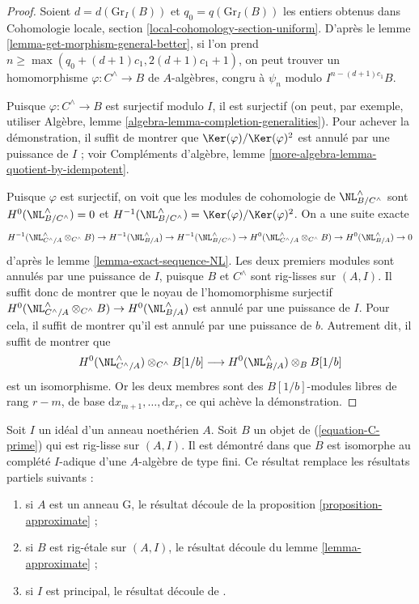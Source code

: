 \begin{proof}
\medskip\noindent
Soient $d = d(\text{Gr}_I(B))$ et $q_0 = q(\text{Gr}_I(B))$ les entiers
obtenus dans Cohomologie locale, section
\ref{local-cohomology-section-uniform}. D'après le lemme
\ref{lemma-get-morphism-general-better}, si l'on prend
$n \geq \max(q_0 + (d + 1)c_1, 2(d + 1)c_1 + 1)$, on peut trouver un
homomorphisme $\varphi : C^\wedge \to B$ de $A$-algèbres, congru à $\psi_n$
modulo $I^{n - (d + 1)c_1}B$.

\medskip\noindent
Puisque $\varphi : C^\wedge \to B$ est surjectif modulo $I$, il est surjectif
(on peut, par exemple, utiliser Algèbre, lemme
\ref{algebra-lemma-completion-generalities}). Pour achever la démonstration, il
suffit de montrer que $\Ker(\varphi)/\Ker(\varphi)^2$ est annulé par une
puissance de $I$ ; voir Compléments d'algèbre, lemme
\ref{more-algebra-lemma-quotient-by-idempotent}.

\medskip\noindent
Puisque $\varphi$ est surjectif, on voit que les modules de cohomologie de
$\NL_{B/C^{\wedge}}^\wedge$ sont
$H^0(\NL_{B/C^{\wedge}}^\wedge) = 0$ et
$H^{-1}(\NL_{B/C^{\wedge}}^\wedge) = \Ker(\varphi)/\Ker(\varphi)^2$.
On a une suite exacte
$$
H^{-1}(\NL_{C^\wedge/A}^\wedge \otimes_{C^\wedge} B) \to
H^{-1}(\NL_{B/A}^\wedge) \to
H^{-1}(\NL_{B/C^{\wedge}}^\wedge) \to
H^0(\NL_{C^\wedge/A}^\wedge \otimes_{C^\wedge} B) \to
H^0(\NL_{B/A}^\wedge) \to 0
$$
d'après le lemme \ref{lemma-exact-sequence-NL}. Les deux premiers modules sont
annulés par une puissance de $I$, puisque $B$ et $C^\wedge$ sont rig-lisses
sur $(A, I)$. Il suffit donc de montrer que le noyau de l'homomorphisme
surjectif
$H^0(\NL_{C^\wedge/A}^\wedge \otimes_{C^\wedge} B) \to
H^0(\NL_{B/A}^\wedge)$ est annulé par une puissance de $I$. Pour cela, il
suffit de montrer qu'il est annulé par une puissance de $b$. Autrement dit,
il suffit de montrer que
$$
H^0(\NL_{C^\wedge/A}^\wedge) \otimes_{C^\wedge} B[1/b]
\longrightarrow
H^0(\NL_{B/A}^\wedge) \otimes_B B[1/b]
$$
est un isomorphisme. Or les deux membres sont des $B[1/b]$-modules libres de
rang $r - m$, de base $\text{d}x_{m + 1}, \ldots, \text{d}x_r$, ce qui achève
la démonstration.
\end{proof}

\begin{remark}
\label{remark-discussion}
Soit $I$ un idéal d'un anneau noethérien $A$. Soit $B$ un objet de
(\ref{equation-C-prime}) qui est rig-lisse sur $(A, I)$. Il est démontré dans
\cite[théorème 1.2]{gabber-zavyalov} que $B$ est isomorphe au complété $I$-adique
d'une $A$-algèbre de type fini. Ce résultat remplace les résultats partiels
suivants :
\begin{enumerate}
\item si $A$ est un anneau G, le résultat découle de la proposition
\ref{proposition-approximate} ;
\item si $B$ est rig-étale sur $(A, I)$, le résultat découle du lemme
\ref{lemma-approximate} ;
\item si $I$ est principal, le résultat découle de
\cite[III théorème 7]{Elkik}.
\end{enumerate}
\end{remark}







